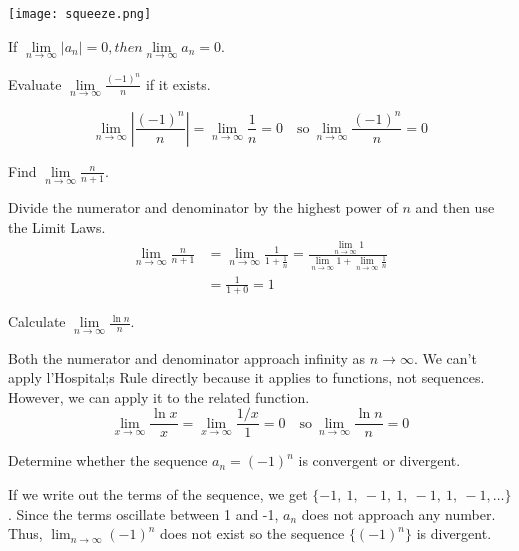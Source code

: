   \begin{center}
    \texttt{[image: squeeze.png]}
  \end{center}
  \begin{theorem}
    If $\lim\limits_{n\to\infty}|a_n| = 0, then \lim\limits_{n\to\infty}a_n = 0$.
  \end{theorem}
  \begin{example}
    Evaluate $\lim\limits_{n\to\infty}\frac{(-1)^n}{n}$ if it exists.
  \end{example}
  \begin{solution}
    $$\lim_{n\to\infty}\left|\frac{(-1)^n}{n}\right|=\lim_{n\to\infty}\frac{1}{n}=0 \quad \text{so}\ \lim_{n\to\infty}\frac{(-1)^n}{n}=0$$
  \end{solution}
  \begin{example}
    Find $\lim\limits_{n \to \infty} \frac{n}{n+1}$.
  \end{example}
  \begin{solution}
    Divide the numerator and denominator by the highest power of $n$ and then use the Limit Laws.
    \begin{align*}
        \lim_{n \to \infty} \frac{n}{n+1} &= \lim_{n \to \infty} \frac{1}{1+\frac{1}{n}} = \frac{\lim\limits_{n \to \infty} 1}{\lim\limits_{n \to \infty}1+\lim\limits_{n \to \infty}\frac{1}{n}} \\
        &= \frac{1}{1+0}=1
    \end{align*}
  \end{solution}
  \begin{example}
    Calculate $\lim\limits_{n \to \infty} \frac{\ln n}{n}$.
  \end{example}
  \begin{solution}
    Both the numerator and denominator approach infinity as $n\to\infty$. We can't apply l'Hospital;s Rule directly because it applies to functions, not sequences. However, we can apply it to the related function.
    \begin{equation*}
        \lim_{x \to \infty} \frac{\ln x}{x} = \lim_{x \to \infty} \frac{1/x}{1} = 0 \quad \text{so}\ \lim\limits_{n \to \infty} \frac{\ln n}{n} = 0
    \end{equation*}
  \end{solution}
  \begin{example}
    Determine whether the sequence $a_n = (-1)^n$ is convergent or divergent.
  \end{example}
  \begin{solution}
    If we write out the terms of the sequence, we get $\{-1,\ 1,\ -1,\ 1,\ -1,\ 1,\ -1,\ldots\}$. Since the terms oscillate between 1 and -1, $a_n$ does not approach any number. Thus, $\lim_{n\to\infty}(-1)^n$ does not exist so the sequence $\{(-1)^n\}$ is divergent.
  \end{solution}
